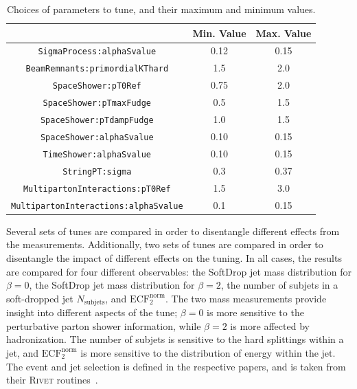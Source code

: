 \begin{table}[ht!]
\centering\begin{tabular}{ | c | | c | c | } \hline
                                     & Min. Value   & Max. Value    \\ \hline
\texttt{SigmaProcess:alphaSvalue}             &  0.12        & 0.15    \\ \hline
\texttt{BeamRemnants:primordialKThard}        &  1.5         & 2.0     \\ \hline
\texttt{SpaceShower:pT0Ref}                   &  0.75        & 2.0     \\ \hline
\texttt{SpaceShower:pTmaxFudge}               &  0.5         & 1.5     \\ \hline
\texttt{SpaceShower:pTdampFudge}              &  1.0         & 1.5     \\ \hline
\texttt{SpaceShower:alphaSvalue}              &  0.10        & 0.15    \\ \hline
\texttt{TimeShower:alphaSvalue}               &  0.10        & 0.15    \\ \hline
\texttt{StringPT:sigma}                       &  0.3         & 0.37    \\ \hline
\texttt{MultipartonInteractions:pT0Ref}       &  1.5         & 3.0     \\ \hline
\texttt{MultipartonInteractions:alphaSvalue}  &  0.1         & 0.15    \\ \hline
\end{tabular}
\label{tab:parameterSpace}
\caption{Choices of parameters to tune, and their maximum and minimum values.}
\end{table}

Several sets of tunes are compared in order to disentangle different effects from the measurements. 
Additionally, two sets of tunes are compared in order to disentangle the impact of different effects on the tuning.
In all cases, the results are compared for four different observables:
the SoftDrop jet mass distribution for $\beta=0$, the SoftDrop jet mass distribution for $\beta=2$, 
the number of subjets in a soft-dropped jet $N_{\mathrm{subjets}}$, and $\mathrm{ECF}_2^{\mathrm{norm}}$.
The two mass measurements provide insight into different aspects of the tune; $\beta=0$ is more sensitive to the perturbative parton shower information, 
while $\beta=2$ is more affected by hadronization. The number of subjets is sensitive to the hard splittings within a jet, and $\mathrm{ECF}_2^{\mathrm{norm}}$ is more sensitive to the 
distribution of energy within the jet. The event and jet selection is defined in the respective papers, and is taken from their \textsc{Rivet} routines~\cite{Buckley:2010ar}.

